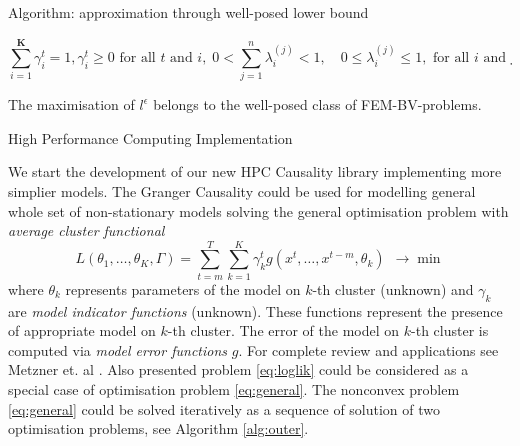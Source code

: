 \documentclass[final,hyperref={pdfpagelabels=false}]{beamer}
\begin{document}
\begin{frame}[t]
\begin{columns}[t]
\begin{column}{.48\textwidth}
\begin{block}{Algorithm:  approximation through well-posed lower bound}

\begin{equation}
\label{eq:loglik_lb_con}
 \sum_{i=1}^{\mathbf{K}}\gamma_i^t=1,  \gamma_i^t\geq 0 \text{ for all $t$ and $i$,} ~~
 0<\sum_{j=1}^n\lambda_{i}^{(j)}< 1,\quad  0\leq\lambda_{i}^{(j)}\leq1, \text{ for all $i$ and $j$,} ~~
 \sum_{t_1,t_2=0}^{N_T}|\gamma_i^{t_1}-\gamma_i^{t_2}|\leq\bar{\mathbf{C}}\left(N_T\right) ,\text{ for all $i$.}
\end{equation}


\noindent The maximisation of $l^\epsilon$ belongs to the well-posed class of FEM-BV-problems.

\end{block}



\begin{block}{High Performance Computing Implementation}

We start the development of our new HPC Causality library implementing more simplier models. 
The Granger Causality could be used for modelling general whole set of non-stationary models solving the general optimisation problem
with \emph{average cluster functional}
\begin{equation}
 \label{eq:general}
 L(\theta_1, \dots, \theta_K, \Gamma) 
 = \sum\limits_{t = m}^{T} \sum\limits_{k = 1}^{K} \gamma_k^t g(x^t,\dots,x^{t-m}, \theta_k) ~~ \rightarrow \min
\end{equation}
where $\theta_k$ represents parameters of the model on $k$-th cluster (unknown)
and $\gamma_k$ are \emph{model indicator functions} (unknown). These functions represent the presence
of appropriate model on $k$-th cluster. The error of the model on $k$-th cluster is computed via \emph{model error functions} $g$.
For complete review and applications see Metzner et. al \cite{metzner_2012}. 
Also presented problem \eqref{eq:loglik} could be considered as a special case of optimisation problem \eqref{eq:general}.
The nonconvex problem \eqref{eq:general} could be solved iteratively as a sequence of solution of two optimisation problems, see Algorithm \ref{alg:outer}.


\end{block}
\end{column}
\end{columns}
\end{frame}
\end{document}
